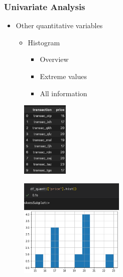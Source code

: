 \begin{frame}\frametitle{Univariate Analysis}
   \begin{minipage}{0.48\linewidth}
      \begin{itemize}
         \item Other quantitative variables
         \begin{itemize}
            \item Histogram
            \begin{itemize}
               \item Overview
               \item Extreme values
               \item All information
            \end{itemize}
         \end{itemize}
      \end{itemize}
      \vspace{.5cm}
      \begin{figure}[H]
         \includegraphics[width=2.2cm]{../images/illustrations/pattern_univariate_quantitative_df.png}
      \end{figure}
   \end{minipage}
   \begin{minipage}{0.48\linewidth}
      \begin{figure}[H]
         \includegraphics[width=5cm]{../images/illustrations/pattern_univariate_quantitative_hist.png}
      \end{figure}
   \end{minipage}
\end{frame}



